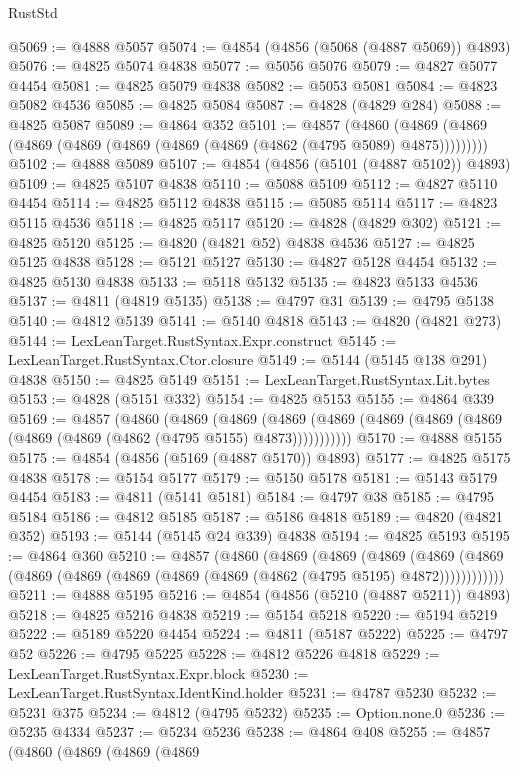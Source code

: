 \begin{lexlean}{RustStd}
\begin{coremodule}
@5069 := @4888 @5057
@5074 := @4854 (@4856 (@5068 (@4887 @5069)) @4893)
@5076 := @4825 @5074 @4838
@5077 := @5056 @5076
@5079 := @4827 @5077 @4454
@5081 := @4825 @5079 @4838
@5082 := @5053 @5081
@5084 := @4823 @5082 @4536
@5085 := @4825 @5084
@5087 := @4828 (@4829 @284)
@5088 := @4825 @5087
@5089 := @4864 @352
@5101 := @4857
    (@4860 (@4869 (@4869 (@4869 (@4869 (@4869 (@4869 (@4869 (@4862 (@4795 @5089) @4875)))))))))
@5102 := @4888 @5089
@5107 := @4854 (@4856 (@5101 (@4887 @5102)) @4893)
@5109 := @4825 @5107 @4838
@5110 := @5088 @5109
@5112 := @4827 @5110 @4454
@5114 := @4825 @5112 @4838
@5115 := @5085 @5114
@5117 := @4823 @5115 @4536
@5118 := @4825 @5117
@5120 := @4828 (@4829 @302)
@5121 := @4825 @5120
@5125 := @4820 (@4821 @52) @4838 @4536
@5127 := @4825 @5125 @4838
@5128 := @5121 @5127
@5130 := @4827 @5128 @4454
@5132 := @4825 @5130 @4838
@5133 := @5118 @5132
@5135 := @4823 @5133 @4536
@5137 := @4811 (@4819 @5135)
@5138 := @4797 @31
@5139 := @4795 @5138
@5140 := @4812 @5139
@5141 := @5140 @4818
@5143 := @4820 (@4821 @273)
@5144 := LexLeanTarget.RustSyntax.Expr.construct
@5145 := LexLeanTarget.RustSyntax.Ctor.closure
@5149 := @5144 (@5145 @138 @291) @4838
@5150 := @4825 @5149
@5151 := LexLeanTarget.RustSyntax.Lit.bytes
@5153 := @4828 (@5151 @332)
@5154 := @4825 @5153
@5155 := @4864 @339
@5169 := @4857
    (@4860
      (@4869
        (@4869
          (@4869 (@4869 (@4869 (@4869 (@4869 (@4869 (@4869 (@4862 (@4795 @5155) @4873)))))))))))
@5170 := @4888 @5155
@5175 := @4854 (@4856 (@5169 (@4887 @5170)) @4893)
@5177 := @4825 @5175 @4838
@5178 := @5154 @5177
@5179 := @5150 @5178
@5181 := @5143 @5179 @4454
@5183 := @4811 (@5141 @5181)
@5184 := @4797 @38
@5185 := @4795 @5184
@5186 := @4812 @5185
@5187 := @5186 @4818
@5189 := @4820 (@4821 @352)
@5193 := @5144 (@5145 @24 @339) @4838
@5194 := @4825 @5193
@5195 := @4864 @360
@5210 := @4857
    (@4860
      (@4869
        (@4869
          (@4869
            (@4869 (@4869 (@4869 (@4869 (@4869 (@4869 (@4869 (@4862 (@4795 @5195) @4872))))))))))))
@5211 := @4888 @5195
@5216 := @4854 (@4856 (@5210 (@4887 @5211)) @4893)
@5218 := @4825 @5216 @4838
@5219 := @5154 @5218
@5220 := @5194 @5219
@5222 := @5189 @5220 @4454
@5224 := @4811 (@5187 @5222)
@5225 := @4797 @52
@5226 := @4795 @5225
@5228 := @4812 @5226 @4818
@5229 := LexLeanTarget.RustSyntax.Expr.block
@5230 := LexLeanTarget.RustSyntax.IdentKind.holder
@5231 := @4787 @5230
@5232 := @5231 @375
@5234 := @4812 (@4795 @5232)
@5235 := Option.none.{0}
@5236 := @5235 @4334
@5237 := @5234 @5236
@5238 := @4864 @408
@5255 := @4857
    (@4860
      (@4869
        (@4869
          (@4869

\end{coremodule}
\end{lexlean}
